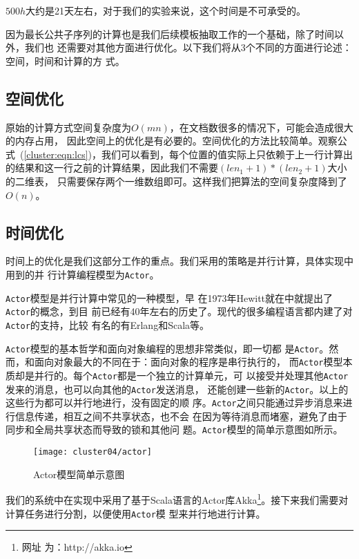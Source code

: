 $500h$大约是21天左右，对于我们的实验来说，这个时间是不可承受的。

因为最长公共子序列的计算也是我们后续模板抽取工作的一个基础，除了时间以外，我们也
还需要对其他方面进行优化。以下我们将从3个不同的方面进行论述：空间，时间和计算的方
式。

\subsection{空间优化}
原始的计算方式空间复杂度为$O(mn)$，在文档数很多的情况下，可能会造成很大的内存占用，
因此空间上的优化是有必要的。空间优化的方法比较简单。观察公
式~(\ref{cluster:eqn:lcs})，我们可以看到，每个位置的值实际上只依赖于上一行计算出
的结果和这一行之前的计算结果，因此我们不需要$(len_1 + 1)* (len_2+1)$大小的二维表，
只需要保存两个一维数组即可。这样我们把算法的空间复杂度降到了$O(n)$。

\subsection{时间优化}
时间上的优化是我们这部分工作的重点。我们采用的策略是并行计算，具体实现中用到的并
行计算编程模型为\texttt{Actor}。

\texttt{Actor}模型是并行计算中常见的一种模型，早
在1973年Hewitt就在\cite{hewitt1973universal}中就提出了\texttt{Actor}的概念，到目
前已经有40年左右的历史了。现代的很多编程语言都内建了对\texttt{Actor}的支持，比较
有名的有Erlang和Scala等。

\texttt{Actor}模型的基本哲学和面向对象编程的思想非常类似，即一切都
是\texttt{Actor}。然而，和面向对象最大的不同在于：面向对象的程序是串行执行的，
而\texttt{Actor}模型本质却是并行的。每个\texttt{Actor}都是一个独立的计算单元，可
以接受并处理其他\texttt{Actor}发来的消息，也可以向其他的\texttt{Actor}发送消息，
还能创建一些新的\texttt{Actor}。以上的这些行为都可以并行地进行，没有固定的顺
序。\texttt{Actor}之间只能通过异步消息来进行信息传递，相互之间不共享状态，也不会
在因为等待消息而堵塞，避免了由于同步和全局共享状态而导致的锁和其他问
题。\texttt{Actor}模型的简单示意图如所示。

\begin{figure}
  \centering
  \texttt{[image: cluster04/actor]}
  \caption{Actor模型简单示意图}
  \label{cluster:fig:actor}
\end{figure}

我们的系统中在实现中采用了基于Scala语言的Actor库Akka\footnote{网址
  为：http://akka.io}。接下来我们需要对计算任务进行分割，以便使用\texttt{Actor}模
型来并行地进行计算。

